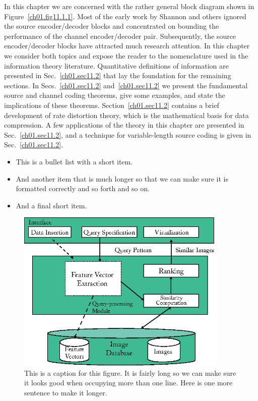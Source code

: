 \noindent In this chapter we are concerned with the rather general block diagram
shown in Figure~\ref{ch01.fig11.1.1}. Most of the early work by
Shannon and others ignored the source  encoder/decoder blocks and
concentrated  on bounding the performance of the channel
encoder/decoder pair. Subsequently, the source  encoder/decoder blocks
have attracted much research attention.  In this chapter we consider
both topics and expose the reader to the nomenclature used in the
information theory literature.
Quantitative definitions of information are presented in
Sec.~\ref{ch01.sec11.2} that lay the foundation for the remaining
sections. In Secs.~\ref{ch01.sec11.2} and~\ref{ch01.sec11.2} we present
the fundamental source and channel coding theorems, give some examples,
and state the implications of these theorems.
Section~\ref{ch01.sec11.2} contains a brief development of rate
distortion theory,
which is the mathematical basis for data compression.
A few applications of the theory in this chapter are presented
in Sec.~\ref{ch01.sec11.2}, and a technique for variable-length
source coding is given in Sec.~\ref{ch01.sec11.2}.
\begin{itemize}
\item This is a bullet list with a short item.
\item And another item that is much longer so that we can make sure it is
formatted correctly and so forth and so on.
\item And a final short item.
\end{itemize}

\begin{figure}
\includegraphics[width=24pc]{fig/sample-figure}
\caption{This is a caption for this figure. It is fairly long so we can make
sure it looks good when occupying more than one line. Here is one more
sentence to make it longer.}
\label{ch01.fig11.1.1}
\label{fig:query-specification}
\end{figure}

